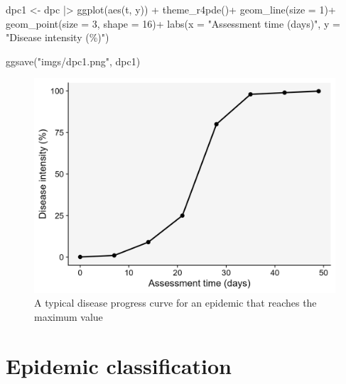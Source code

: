 \documentclass[
  letterpaper,
]{book}
\newenvironment{Shaded}{\begin{snugshade}}{\end{snugshade}}
\newcommand{\AttributeTok}[1]{\textcolor[rgb]{0.40,0.45,0.13}{#1}}
\newcommand{\DecValTok}[1]{\textcolor[rgb]{0.68,0.00,0.00}{#1}}
\newcommand{\FunctionTok}[1]{\textcolor[rgb]{0.28,0.35,0.67}{#1}}
\newcommand{\NormalTok}[1]{\textcolor[rgb]{0.00,0.23,0.31}{#1}}
\newcommand{\OtherTok}[1]{\textcolor[rgb]{0.00,0.23,0.31}{#1}}
\newcommand{\SpecialCharTok}[1]{\textcolor[rgb]{0.37,0.37,0.37}{#1}}
\newcommand{\StringTok}[1]{\textcolor[rgb]{0.13,0.47,0.30}{#1}}
\begin{document}
\begin{Shaded}
\begin{Highlighting}[]
\NormalTok{dpc1 }\OtherTok{\textless{}{-}}\NormalTok{ dpc }\SpecialCharTok{|\textgreater{}}
  \FunctionTok{ggplot}\NormalTok{(}\FunctionTok{aes}\NormalTok{(t, y)) }\SpecialCharTok{+}
  \FunctionTok{theme\_r4pde}\NormalTok{()}\SpecialCharTok{+}
  \FunctionTok{geom\_line}\NormalTok{(}\AttributeTok{size =} \DecValTok{1}\NormalTok{)}\SpecialCharTok{+}
  \FunctionTok{geom\_point}\NormalTok{(}\AttributeTok{size =} \DecValTok{3}\NormalTok{, }\AttributeTok{shape =} \DecValTok{16}\NormalTok{)}\SpecialCharTok{+}
  \FunctionTok{labs}\NormalTok{(}\AttributeTok{x =} \StringTok{"Assessment time (days)"}\NormalTok{,}
       \AttributeTok{y =} \StringTok{"Disease intensity (\%)"}\NormalTok{)}

\FunctionTok{ggsave}\NormalTok{(}\StringTok{"imgs/dpc1.png"}\NormalTok{, dpc1)}
\end{Highlighting}
\end{Shaded}

\begin{figure}

\includegraphics{imgs/dpc1.png} \hfill{}

\caption{\label{fig-dpc1}A typical disease progress curve for an
epidemic that reaches the maximum value}

\end{figure}

\hypertarget{epidemic-classification}{%
\section{Epidemic classification}\label{epidemic-classification}}
\end{document}
